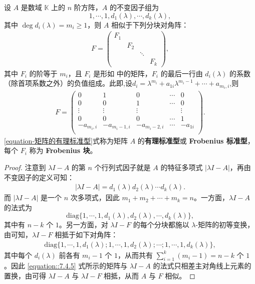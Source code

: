 \documentclass[../../main.tex]{subfiles}
\begin{document}
\begin{theorem}\label{theorem:有理标准型核心定理}
设 $A$ 是数域 $\mathbb{K}$ 上的 $n$ 阶方阵，$A$ 的不变因子组为
\[
1,\cdots,1,d_1(\lambda),\cdots,d_k(\lambda),
\]
其中 $\deg d_i(\lambda)=m_i\geq1$，则 $A$ 相似于下列分块对角阵：
\begin{align}\label{equation-矩阵的有理标准型}
F = \begin{pmatrix}
F_1 & & & \\
& F_2 & & \\
& & \ddots & \\
& & & F_k
\end{pmatrix},
\end{align}
其中 $F_i$ 的阶等于 $m_i$，且 $F_i$ 是形如 中的矩阵，$F_i$ 的最后一行由 $d_i(\lambda)$ 的系数（除首项系数之外）的负值组成。此即,设$d_i=\lambda ^{m_i}+a_{1i}\lambda ^{m_i-1}+\cdots +a_{m_i,i}$,则
\begin{align*}
F=\left( \begin{matrix}
0&		1&		0&		\cdots&		0\\
0&		0&		1&		\cdots&		0\\
\vdots&		\vdots&		\vdots&		&		\vdots\\
0&		0&		0&		\cdots&		1\\
-a_{m_i,i}&		-a_{m_i-1,i}&		-a_{m_i-2,i}&		\cdots&		-a_{1i}\\
\end{matrix} \right) .
\end{align*}
\eqref{equation-矩阵的有理标准型}式称为矩阵 $A$ 的\textbf{有理标准型}或 \textbf{Frobenius 标准型}，每个 $F_i$ 称为 \textbf{Frobenius 块}。 
\end{theorem}
\begin{proof}
注意到 $\lambda I - A$ 的第 $n$ 个行列式因子就是 $A$ 的特征多项式 $|\lambda I - A|$，再由不变因子的定义可知：
\begin{align*}
|\lambda I - A| = d_1(\lambda)d_2(\lambda)\cdots d_k(\lambda).
\end{align*}
而 $|\lambda I - A|$ 是一个 $n$ 次多项式，因此 $m_1 + m_2 + \cdots + m_k = n$。一方面，$\lambda I - A$ 的法式为
\[
\mathrm{diag}\{1,\cdots,1,d_1(\lambda),d_2(\lambda),\cdots,d_k(\lambda)\},
\]
其中有 $n - k$ 个 $1$。另一方面，对 $\lambda I - F$ 的每个分块都施以 $\lambda$-矩阵的初等变换，由可知，$\lambda I - F$ 相抵于如下对角阵：
\begin{align}
\mathrm{diag}\{1,\cdots,1,d_1(\lambda);1,\cdots,1,d_2(\lambda);\cdots;1,\cdots,1,d_k(\lambda)\},
\label{equation::7.4.5}
\end{align}
其中每个 $d_i(\lambda)$ 前各有 $m_i - 1$ 个 $1$，从而共有 $\sum_{i = 1}^{k}(m_i - 1)=n - k$ 个 $1$。因此 \eqref{equation::7.4.5} 式所示的矩阵与 $\lambda I - A$ 的法式只相差主对角线上元素的置换，由可得 $\lambda I - A$ 与 $\lambda I - F$ 相抵，从而 $A$ 与 $F$ 相似。
\end{proof}
\end{document}
